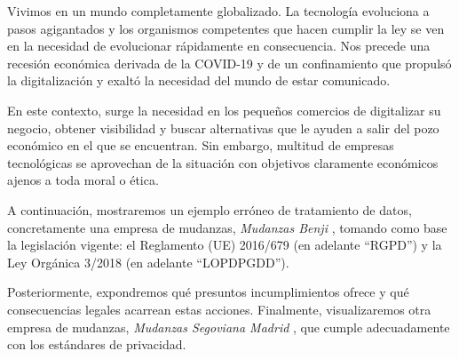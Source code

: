 Vivimos en un mundo completamente globalizado. La tecnología evoluciona a pasos agigantados y los organismos competentes que hacen cumplir la ley se ven en la necesidad de evolucionar rápidamente en consecuencia. Nos precede una recesión económica derivada de la COVID-19 y de un confinamiento que propulsó la digitalización y exaltó la necesidad del mundo de estar comunicado.

En este contexto, surge la necesidad en los pequeños comercios de digitalizar su negocio, obtener visibilidad y buscar alternativas que le ayuden a salir del pozo económico en el que se encuentran. Sin embargo, multitud de empresas tecnológicas se aprovechan de la situación con objetivos claramente económicos ajenos a toda moral o ética.

A continuación, mostraremos un ejemplo erróneo de tratamiento de datos, concretamente una empresa de mudanzas, \textit{Mudanzas Benji} \cite{benji}, tomando como base la legislación vigente: el Reglamento (UE) 2016/679 \cite{RGPD} (en adelante ``RGPD'') y la Ley Orgánica 3/2018 \cite{LOPDPGDD} (en adelante ``LOPDPGDD'').

Posteriormente, expondremos qué presuntos incumplimientos ofrece y qué consecuencias legales acarrean estas acciones. Finalmente, visualizaremos otra empresa de mudanzas, \textit{Mudanzas Segoviana Madrid} \cite{alcorcon}, que cumple adecuadamente con los estándares de privacidad.
